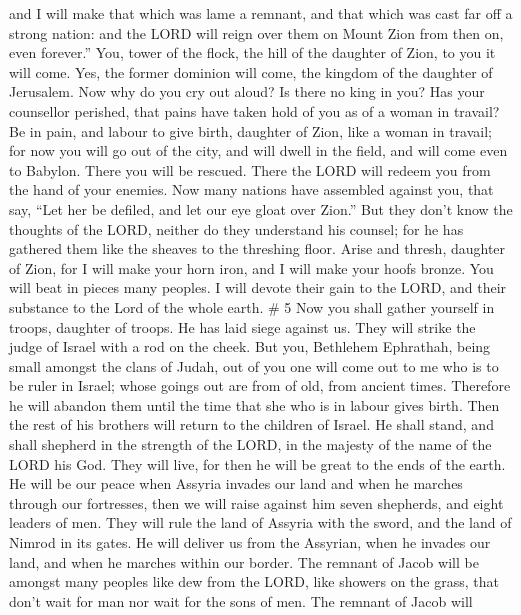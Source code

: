  and I will make that which was lame a remnant, and that
which was cast far off a strong nation: and the LORD will reign over
them on Mount Zion from then on, even forever.''  You, tower
of the flock, the hill of the daughter of Zion, to you it will come.
Yes, the former dominion will come, the kingdom of the daughter of
Jerusalem.  Now why do you cry out aloud? Is there no king
in you? Has your counsellor perished, that pains have taken hold of you
as of a woman in travail?  Be in pain, and labour to give
birth, daughter of Zion, like a woman in travail; for now you will go
out of the city, and will dwell in the field, and will come even to
Babylon. There you will be rescued. There the LORD will redeem you from
the hand of your enemies.  Now many nations have assembled
against you, that say, ``Let her be defiled, and let our eye gloat over
Zion.''  But they don't know the thoughts of the LORD,
neither do they understand his counsel; for he has gathered them like
the sheaves to the threshing floor.  Arise and thresh,
daughter of Zion, for I will make your horn iron, and I will make your
hoofs bronze. You will beat in pieces many peoples. I will devote their
gain to the LORD, and their substance to the Lord of the whole earth. \#
5  Now you shall gather yourself in troops, daughter of
troops. He has laid siege against us. They will strike the judge of
Israel with a rod on the cheek.  But you, Bethlehem
Ephrathah, being small amongst the clans of Judah, out of you one will
come out to me who is to be ruler in Israel; whose goings out are from
of old, from ancient times.  Therefore he will abandon them
until the time that she who is in labour gives birth. Then the rest of
his brothers will return to the children of Israel.  He
shall stand, and shall shepherd in the strength of the LORD, in the
majesty of the name of the LORD his God. They will live, for then he
will be great to the ends of the earth.  He will be our
peace when Assyria invades our land and when he marches through our
fortresses, then we will raise against him seven shepherds, and eight
leaders of men.  They will rule the land of Assyria with the
sword, and the land of Nimrod in its gates. He will deliver us from the
Assyrian, when he invades our land, and when he marches within our
border.  The remnant of Jacob will be amongst many peoples
like dew from the LORD, like showers on the grass, that don't wait for
man nor wait for the sons of men.  The remnant of Jacob will
